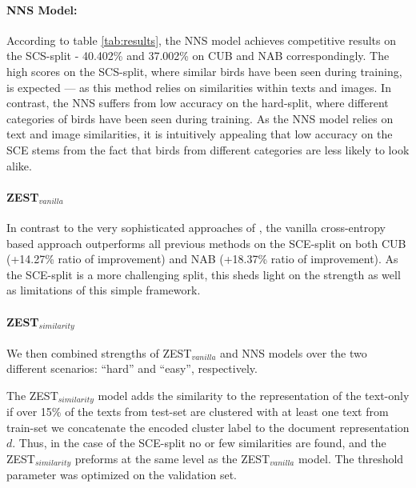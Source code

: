 \documentclass[11pt,a4paper]{article}
\newcommand\yuval[1]{\textcolor{darkpink}{\textbf{YUVAL:} #1 }}
\begin{document}
\paragraph{NNS Model:} 
According to table \ref{tab:results}, the NNS model achieves competitive results on the SCS-split - 40.402\% and 37.002\% on CUB and NAB correspondingly. The high scores on the SCS-split, where similar birds have been seen during training, is expected --- as this method relies on similarities within texts and images. 
%
In contrast, the NNS suffers from low accuracy on the hard-split, where different categories of birds have been seen  during training. As the NNS model relies on text and image similarities, it is intuitively appealing that low accuracy on the SCE stems from the fact that birds from different categories are less likely to look alike. 

\paragraph{ZEST$_{vanilla}$}
In contrast to the very sophisticated approaches of \citet{zhu2018generative}, the vanilla cross-entropy based approach %
outperforms all previous methods on the SCE-split on both CUB (+14.27\% ratio of improvement) and NAB (+18.37\%  ratio of improvement). As the SCE-split is a more challenging split, this sheds light on the strength as well as limitations of this simple framework.  

\paragraph{ZEST$_{similarity}$}

We then combined strengths of ZEST$_{vanilla}$ and NNS models over the two different scenarios: \enquote{hard} and \enquote{easy}, respectively. 

The ZEST$_{similarity}$ model adds the similarity to the representation of the text-only if over 15\% of the texts from test-set are clustered with at least one text from train-set we concatenate the encoded cluster label to the document representation $d$.
Thus, in the case of the SCE-split no or few similarities are found, and the ZEST$_{similarity}$ preforms at the same level as the ZEST$_{vanilla}$ model. %
The threshold parameter was optimized on the validation set. 
\end{document}
